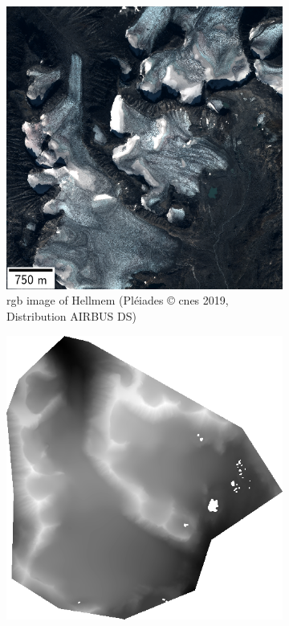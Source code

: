 \begin{figure}
    \centering
    \begin{subfigure}[t]{0.48\linewidth}
        \flushleft
        \includegraphics[width=\linewidth]{Images/Chap_6/miniature_Hellmem.png}
        \caption{\acrshort{rgb} image of Hellmem (Pléiades © \acrshort{cnes} 2019, Distribution AIRBUS DS)}
        \label{fig:miniature_Hellmem_rgb}
    \end{subfigure}\hfill
    \begin{subfigure}[t]{0.48\linewidth}
        \flushright
        \includegraphics[width=\linewidth]{Images/Chap_6/miniature_Hellmem_gt.png}

\end{subfigure}
\end{figure}
